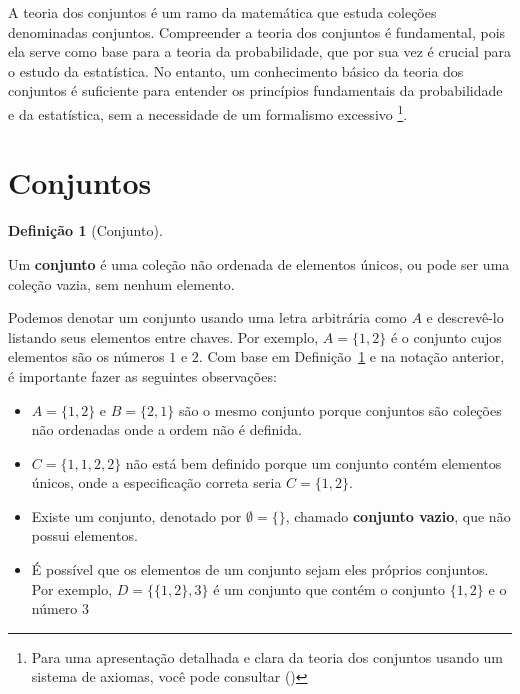 \documentclass[
  letterpaper,
]{book}
\theoremstyle{definition}
\newtheorem{definition}{Definição}[chapter]
\theoremstyle{plain}
\theoremstyle{remark}
\begin{document}
A teoria dos conjuntos é um ramo da matemática que estuda coleções
denominadas conjuntos. Compreender a teoria dos conjuntos é fundamental,
pois ela serve como base para a teoria da probabilidade, que por sua vez
é crucial para o estudo da estatística. No entanto, um conhecimento
básico da teoria dos conjuntos é suficiente para entender os princípios
fundamentais da probabilidade e da estatística, sem a necessidade de um
formalismo excessivo \footnote{Para uma apresentação detalhada e clara
  da teoria dos conjuntos usando um sistema de axiomas, você pode
  consultar ()}.

\section{Conjuntos}\label{conjuntos}

\begin{definition}[Conjunto]\protect\hypertarget{def-set}{}\label{def-set}

Um \textbf{conjunto} é uma coleção não ordenada de elementos únicos, ou
pode ser uma coleção vazia, sem nenhum elemento.

\end{definition}

Podemos denotar um conjunto usando uma letra arbitrária como \(A\) e
descrevê-lo listando seus elementos entre chaves. Por exemplo,
\(A = \{ 1,2 \}\) é o conjunto cujos elementos são os números \(1\) e
\(2\). Com base em Definição~\ref{def-set} e na notação anterior, é
importante fazer as seguintes observações:

\begin{itemize}
\item
  \(A = \{ 1, 2 \}\) e \(B = \{ 2, 1 \}\) são o mesmo conjunto porque
  conjuntos são coleções não ordenadas onde a ordem não é definida.
\item
  \(C = \{ 1, 1, 2, 2 \}\) não está bem definido porque um conjunto
  contém elementos únicos, onde a especificação correta seria
  \(C = \{ 1, 2 \}\).
\item
  Existe um conjunto, denotado por \(\emptyset = \{ \}\), chamado
  \textbf{conjunto vazio}, que não possui elementos.
\item
  É possível que os elementos de um conjunto sejam eles próprios
  conjuntos. Por exemplo, \(D = \{ \{ 1, 2\}, 3 \}\) é um conjunto que
  contém o conjunto \(\{ 1, 2\}\) e o número \(3\)
\end{itemize}
\end{document}
